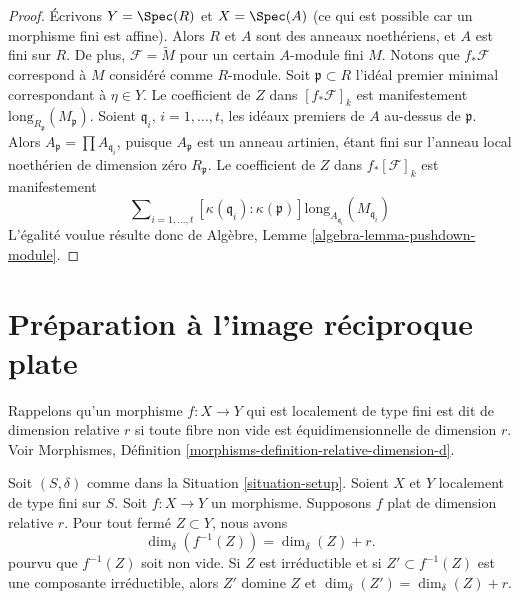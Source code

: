 \begin{proof}
\medskip\noindent
Écrivons $Y = \Spec(R)$ et $X = \Spec(A)$ (ce qui est possible car
un morphisme fini est affine).
Alors $R$ et $A$ sont des anneaux noethériens, et $A$ est fini sur $R$.
De plus, $\mathcal{F} = \widetilde{M}$ pour un certain $A$-module fini
$M$. Notons que $f_*\mathcal{F}$ correspond à $M$ considéré comme $R$-module.
Soit $\mathfrak p \subset R$ l'idéal premier minimal correspondant
à $\eta \in Y$. Le coefficient de $Z$ dans $[f_*\mathcal{F}]_k$
est manifestement $\text{long}_{R_{\mathfrak p}}(M_{\mathfrak p})$.
Soient $\mathfrak q_i$, $i = 1, \ldots, t$, les idéaux premiers de $A$
au-dessus de $\mathfrak p$. Alors $A_{\mathfrak p} = \prod A_{\mathfrak q_i}$,
puisque $A_{\mathfrak p}$ est un anneau artinien, étant fini sur l'anneau
local noethérien de dimension zéro $R_{\mathfrak p}$.
Le coefficient de $Z$ dans $f_*[\mathcal{F}]_k$ est manifestement
$$
\sum\nolimits_{i = 1, \ldots, t}
[\kappa(\mathfrak q_i) : \kappa(\mathfrak p)]
\text{long}_{A_{\mathfrak q_i}}(M_{\mathfrak q_i})
$$
L'égalité voulue résulte donc de
Algèbre, Lemme \ref{algebra-lemma-pushdown-module}.
\end{proof}




















\section{Préparation à l'image réciproque plate}
\label{section-preparation-flat-pullback}


\noindent
Rappelons qu'un morphisme $f : X \to Y$ qui est localement de type fini
est dit de dimension relative $r$ si toute fibre non vide
est équidimensionnelle de dimension $r$. Voir
Morphismes, Définition \ref{morphisms-definition-relative-dimension-d}.

\begin{lemma}
\label{lemma-flat-inverse-image-dimension}
Soit $(S, \delta)$ comme dans la Situation \ref{situation-setup}.
Soient $X$ et $Y$ localement de type fini sur $S$.
Soit $f : X \to Y$ un morphisme.
Supposons $f$ plat de dimension relative $r$.
Pour tout fermé $Z \subset Y$, nous avons
$$
\dim_\delta(f^{-1}(Z)) = \dim_\delta(Z) + r.
$$
pourvu que $f^{-1}(Z)$ soit non vide.
Si $Z$ est irréductible et si $Z' \subset f^{-1}(Z)$ est une composante irréductible,
alors $Z'$ domine $Z$ et
$\dim_\delta(Z') = \dim_\delta(Z) + r$.
\end{lemma}

